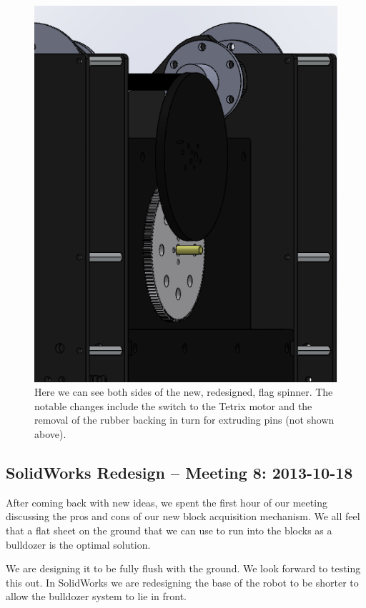 \begin{figure}[H]
\begin{center}
\includegraphics[scale=0.5]{images/FlagSpinnerV2Front.png}
\end{center}
\caption{Here we can see both sides of the new, redesigned, flag spinner. The notable changes include the switch to the Tetrix motor and the removal of the rubber backing in turn for extruding pins (not shown above).}
\end{figure}

\newpage \subsection{SolidWorks Redesign -- Meeting 8: 2013-10-18}
After coming back with new ideas, we spent the first hour of our meeting discussing the pros and cons of our new block acquisition mechanism. We all feel that a flat sheet on the ground that we can use to run into the blocks as a bulldozer is the optimal solution. 

We are designing it to be fully flush with the ground. We look forward to testing this out. In SolidWorks we are redesigning the base of the robot to be shorter to allow the bulldozer system to lie in front. 

